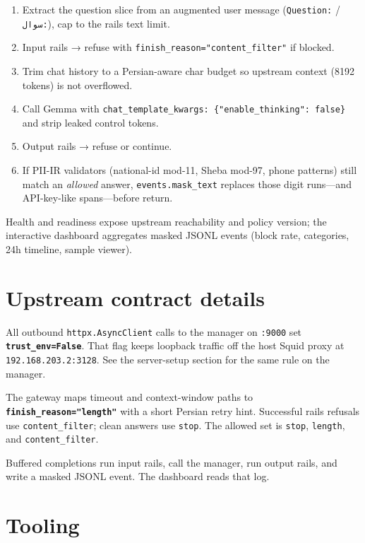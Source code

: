 \begin{enumerate}
\def\labelenumi{\arabic{enumi}.}
\item
  Extract the question slice from an augmented user message (\texttt{Question:} / \texttt{سوال:}), cap to the rails text limit.
\item
  Input rails → refuse with \texttt{finish\_reason="content\_filter"} if blocked.
\item
  Trim chat history to a Persian-aware char budget so upstream context (8192 tokens) is not overflowed.
\item
  Call Gemma with \texttt{chat\_template\_kwargs:\ \{"enable\_thinking":\ false\}} and strip leaked control tokens.
\item
  Output rails → refuse or continue.
\item
  If PII-IR validators (national-id mod-11, Sheba mod-97, phone patterns) still match an \emph{allowed} answer, \texttt{events.mask\_text} replaces those digit runs---and API-key-like spans---before return.
\end{enumerate}

Health and readiness expose upstream reachability and policy version; the interactive dashboard aggregates masked JSONL events (block rate, categories, 24h timeline, sample viewer).

\section{Upstream contract details}\label{upstream-contract-details}

All outbound \texttt{httpx.AsyncClient} calls to the manager on \texttt{:9000} set \textbf{\texttt{trust\_env=False}}. That flag keeps loopback traffic off the host Squid proxy at \texttt{192.168.203.2:3128}. See the server-setup section for the same rule on the manager.

The gateway maps timeout and context-window paths to \textbf{\texttt{finish\_reason="length"}} with a short Persian retry hint. Successful rails refusals use \texttt{content\_filter}; clean answers use \texttt{stop}. The allowed set is \texttt{stop}, \texttt{length}, and \texttt{content\_filter}.

Buffered completions run input rails, call the manager, run output rails, and write a masked JSONL event. The dashboard reads that log.

\section{Tooling}\label{tooling}

